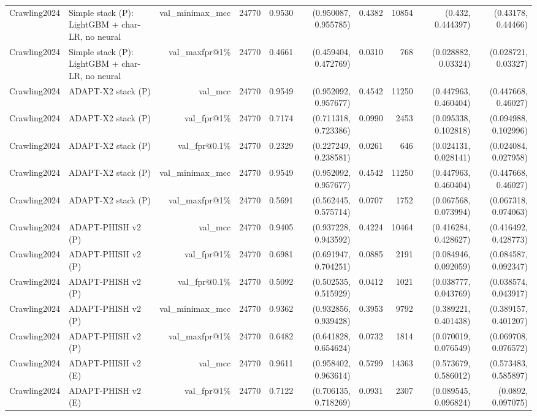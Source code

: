 \begin{table}[t]
\begin{tabular}{llrrrrrrrr}
Crawling2024 & Simple stack (P): LightGBM + char-LR, no neural & val\_minimax\_mcc & 24770 & 0.9530 & (0.950087, 0.955785) & 0.4382 & 10854 & (0.432, 0.444397) & (0.43178, 0.44466) \\
Crawling2024 & Simple stack (P): LightGBM + char-LR, no neural & val\_maxfpr@1\% & 24770 & 0.4661 & (0.459404, 0.472769) & 0.0310 & 768 & (0.028882, 0.03324) & (0.028721, 0.03327) \\
Crawling2024 & ADAPT-X2 stack (P) & val\_mcc & 24770 & 0.9549 & (0.952092, 0.957677) & 0.4542 & 11250 & (0.447963, 0.460404) & (0.447668, 0.46027) \\
Crawling2024 & ADAPT-X2 stack (P) & val\_fpr@1\% & 24770 & 0.7174 & (0.711318, 0.723386) & 0.0990 & 2453 & (0.095338, 0.102818) & (0.094988, 0.102996) \\
Crawling2024 & ADAPT-X2 stack (P) & val\_fpr@0.1\% & 24770 & 0.2329 & (0.227249, 0.238581) & 0.0261 & 646 & (0.024131, 0.028141) & (0.024084, 0.027958) \\
Crawling2024 & ADAPT-X2 stack (P) & val\_minimax\_mcc & 24770 & 0.9549 & (0.952092, 0.957677) & 0.4542 & 11250 & (0.447963, 0.460404) & (0.447668, 0.46027) \\
Crawling2024 & ADAPT-X2 stack (P) & val\_maxfpr@1\% & 24770 & 0.5691 & (0.562445, 0.575714) & 0.0707 & 1752 & (0.067568, 0.073994) & (0.067318, 0.074063) \\
Crawling2024 & ADAPT-PHISH v2 (P) & val\_mcc & 24770 & 0.9405 & (0.937228, 0.943592) & 0.4224 & 10464 & (0.416284, 0.428627) & (0.416492, 0.428773) \\
Crawling2024 & ADAPT-PHISH v2 (P) & val\_fpr@1\% & 24770 & 0.6981 & (0.691947, 0.704251) & 0.0885 & 2191 & (0.084946, 0.092059) & (0.084587, 0.092347) \\
Crawling2024 & ADAPT-PHISH v2 (P) & val\_fpr@0.1\% & 24770 & 0.5092 & (0.502535, 0.515929) & 0.0412 & 1021 & (0.038777, 0.043769) & (0.038574, 0.043917) \\
Crawling2024 & ADAPT-PHISH v2 (P) & val\_minimax\_mcc & 24770 & 0.9362 & (0.932856, 0.939428) & 0.3953 & 9792 & (0.389221, 0.401438) & (0.389157, 0.401207) \\
Crawling2024 & ADAPT-PHISH v2 (P) & val\_maxfpr@1\% & 24770 & 0.6482 & (0.641828, 0.654624) & 0.0732 & 1814 & (0.070019, 0.076549) & (0.069708, 0.076572) \\
Crawling2024 & ADAPT-PHISH v2 (E) & val\_mcc & 24770 & 0.9611 & (0.958402, 0.963614) & 0.5799 & 14363 & (0.573679, 0.586012) & (0.573483, 0.585897) \\
Crawling2024 & ADAPT-PHISH v2 (E) & val\_fpr@1\% & 24770 & 0.7122 & (0.706135, 0.718269) & 0.0931 & 2307 & (0.089545, 0.096824) & (0.0892, 0.097075) \\

\end{tabular}
\end{table}
